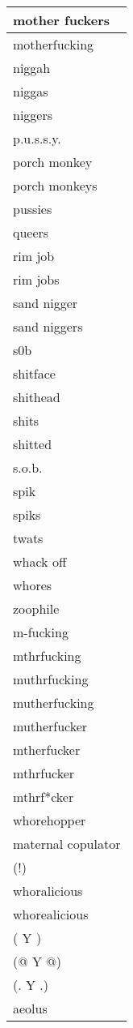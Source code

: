 \begin{longtable}{|l|}
mother fuckers \\ \hline 
motherfucking \\ \hline 
niggah \\ \hline 
niggas \\ \hline 
niggers \\ \hline 
p.u.s.s.y. \\ \hline 
porch monkey \\ \hline 
porch monkeys \\ \hline 
pussies \\ \hline 
queers \\ \hline 
rim job \\ \hline 
rim jobs \\ \hline 
sand nigger \\ \hline 
sand niggers \\ \hline 
s0b \\ \hline 
shitface \\ \hline 
shithead \\ \hline 
shits \\ \hline 
shitted \\ \hline 
s.o.b. \\ \hline 
spik \\ \hline 
spiks \\ \hline 
twats \\ \hline 
whack off \\ \hline 
whores \\ \hline 
zoophile \\ \hline 
m-fucking \\ \hline 
mthrfucking \\ \hline 
muthrfucking \\ \hline 
mutherfucking \\ \hline 
mutherfucker \\ \hline 
mtherfucker \\ \hline 
mthrfucker \\ \hline 
mthrf*cker \\ \hline 
whorehopper \\ \hline 
maternal copulator \\ \hline 
(!) \\ \hline 
whoralicious \\ \hline 
whorealicious \\ \hline 
( Y ) \\ \hline 
(@ Y @) \\ \hline 
(. Y .) \\ \hline 
aeolus \\ \hline 

\end{longtable}
